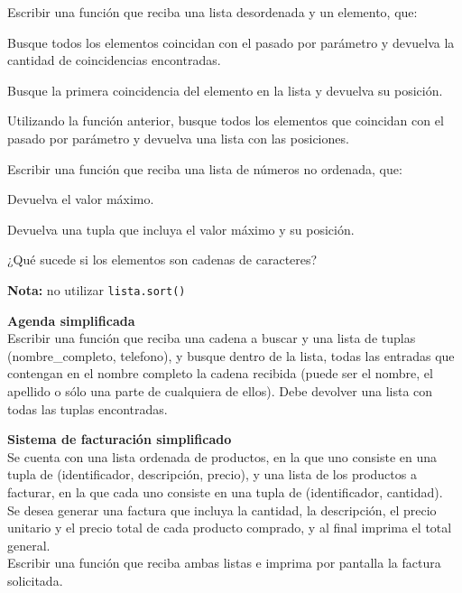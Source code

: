 \begin{ejercicio}
Escribir una función que reciba una lista desordenada y un elemento, que:
\begin{partes}
\item Busque todos los elementos coincidan con el pasado por parámetro y
devuelva la cantidad de coincidencias encontradas.
\item Busque la primera coincidencia del elemento en la lista y devuelva su
posición.
\item Utilizando la función anterior, busque todos los elementos que coincidan
con el pasado por parámetro y devuelva una lista con las posiciones.
\end{partes}
\end{ejercicio}


\begin{ejercicio}
Escribir una función que reciba una lista de números no ordenada, que:
\begin{partes}
\item Devuelva el valor máximo.
\item Devuelva una tupla que incluya el valor máximo y su posición.
\item ¿Qué sucede si los elementos son cadenas de caracteres?
\end{partes}
{\bf Nota:} no utilizar \verb!lista.sort()!
\end{ejercicio}


\begin{ejercicio}
{\bf Agenda simplificada} \\
Escribir una función que reciba una cadena a buscar y una lista de tuplas
(nombre\_completo, telefono), y busque dentro de la lista, todas las
entradas que contengan en el nombre completo la cadena recibida (puede
ser el nombre, el apellido o sólo una parte de cualquiera de ellos).
Debe devolver una lista con todas las tuplas encontradas.
\end{ejercicio}


\begin{ejercicio}
{\bf Sistema de facturación simplificado} \\
Se cuenta con una lista ordenada de productos, en la que uno consiste en
una tupla de (identificador, descripción, precio), y una lista de los
productos a facturar, en la que cada uno consiste en una tupla de
(identificador, cantidad). \\
Se desea generar una factura que incluya la cantidad, la descripción, el
precio unitario y el precio total de cada producto comprado, y al final
imprima el total general. \\
Escribir una función que reciba ambas listas e imprima por
pantalla la factura solicitada.
\end{ejercicio}


